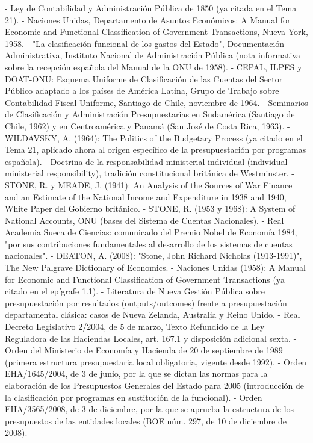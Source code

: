 \documentclass[10pt,a4paper]{article}
\begin{document}
- Ley de Contabilidad y Administración Pública de 1850 (ya citada en el Tema 21).
- Naciones Unidas, Departamento de Asuntos Económicos: A Manual for Economic and Functional Classification of Government Transactions, Nueva York, 1958.
- "La clasificación funcional de los gastos del Estado", Documentación Administrativa, Instituto Nacional de Administración Pública (nota informativa sobre la recepción española del Manual de la ONU de 1958).
- CEPAL, ILPES y DOAT-ONU: Esquema Uniforme de Clasificación de las Cuentas del Sector Público adaptado a los países de América Latina, Grupo de Trabajo sobre Contabilidad Fiscal Uniforme, Santiago de Chile, noviembre de 1964.
- Seminarios de Clasificación y Administración Presupuestarias en Sudamérica (Santiago de Chile, 1962) y en Centroamérica y Panamá (San José de Costa Rica, 1963).
- WILDAVSKY, A. (1964): The Politics of the Budgetary Process (ya citado en el Tema 21, aplicado ahora al origen específico de la presupuestación por programas española).
- Doctrina de la responsabilidad ministerial individual (individual ministerial responsibility), tradición constitucional británica de Westminster.
- STONE, R. y MEADE, J. (1941): An Analysis of the Sources of War Finance and an Estimate of the National Income and Expenditure in 1938 and 1940, White Paper del Gobierno británico.
- STONE, R. (1953 y 1968): A System of National Accounts, ONU (bases del Sistema de Cuentas Nacionales).
- Real Academia Sueca de Ciencias: comunicado del Premio Nobel de Economía 1984, "por sus contribuciones fundamentales al desarrollo de los sistemas de cuentas nacionales".
- DEATON, A. (2008): "Stone, John Richard Nicholas (1913-1991)", The New Palgrave Dictionary of Economics.
- Naciones Unidas (1958): A Manual for Economic and Functional Classification of Government Transactions (ya citado en el epígrafe 1.1).
- Literatura de Nueva Gestión Pública sobre presupuestación por resultados (outputs/outcomes) frente a presupuestación departamental clásica: casos de Nueva Zelanda, Australia y Reino Unido.
- Real Decreto Legislativo 2/2004, de 5 de marzo, Texto Refundido de la Ley Reguladora de las Haciendas Locales, art. 167.1 y disposición adicional sexta.
- Orden del Ministerio de Economía y Hacienda de 20 de septiembre de 1989 (primera estructura presupuestaria local obligatoria, vigente desde 1992).
- Orden EHA/1645/2004, de 3 de junio, por la que se dictan las normas para la elaboración de los Presupuestos Generales del Estado para 2005 (introducción de la clasificación por programas en sustitución de la funcional).
- Orden EHA/3565/2008, de 3 de diciembre, por la que se aprueba la estructura de los presupuestos de las entidades locales (BOE núm. 297, de 10 de diciembre de 2008).
\end{document}
